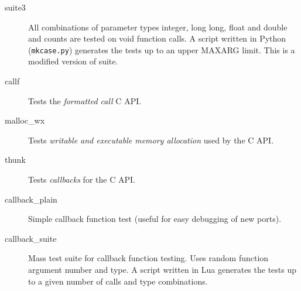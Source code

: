 \begin{description}
\item [suite3]

All combinations of parameter types integer, long long, float and double and
counts are tested on void function calls.
A script written in Python ({\tt mkcase.py}) generates the tests up to
an upper MAXARG limit.
This is a modified version of suite.

\item [callf]

Tests the \emph{formatted call}  C API.

\item [malloc\_wx]

Tests \emph{writable and executable memory allocation} used by the  C API.

\item [thunk]

Tests \emph{callbacks} for the  C API.

\item [callback\_plain]
Simple callback function test (useful for easy debugging of new ports).

\item [callback\_suite]
Mass test suite for callback function testing. Uses random function argument number and type.
A script written in Lua generates the tests up to a given number of calls and type combinations.

\end{description}

